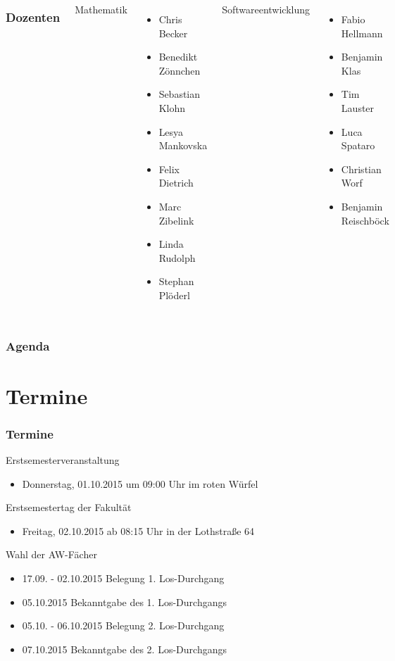 \documentclass{beamer}
\begin{document}
	\begin{frame}
		\begin{columns}[t]
			\frametitle{Dozenten}
			Mathematik
			\begin{itemize}
				\item Chris Becker
				\item Benedikt Zönnchen
				\item Sebastian Klohn
				\item Lesya Mankovska
				\item Felix Dietrich
				\item Marc Zibelink
				\item Linda Rudolph
				\item Stephan Plöderl
			\end{itemize}
			Softwareentwicklung
			\begin{itemize}
				\item Fabio Hellmann
				\item Benjamin Klas
				\item Tim Lauster
				\item Luca Spataro
				\item Christian Worf
				\item Benjamin Reischböck
			\end{itemize}
		\end{columns}
	\end{frame}
	
	\begin{frame}
		\frametitle{Agenda}
		\tableofcontents
	\end{frame}
	
	\section{Termine}
	\begin{frame}
		\frametitle{Termine}
		Erstsemesterveranstaltung
		\begin{itemize}
			\item Donnerstag, 01.10.2015 um 09:00 Uhr im roten Würfel
		\end{itemize}
		\pause
		Erstsemestertag der Fakultät
		\begin{itemize}
			\item Freitag, 02.10.2015 ab 08:15 Uhr in der Lothstraße 64
		\end{itemize}
		\pause
		Wahl der AW-Fächer
		\begin{itemize}
			\item 17.09. - 02.10.2015 Belegung 1. Los-Durchgang
			\item 05.10.2015 Bekanntgabe des 1. Los-Durchgangs
			\item 05.10. - 06.10.2015 Belegung 2. Los-Durchgang
			\item 07.10.2015 Bekanntgabe des 2. Los-Durchgangs
		\end{itemize}
	\end{frame}
	
\end{document}
